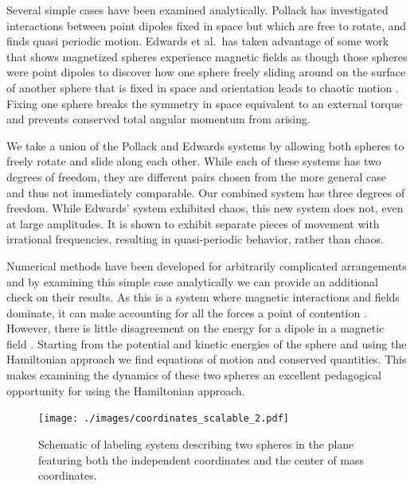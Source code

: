 \documentclass[prbg,preprint]{revtex4-1}
\begin{document}
Several simple cases have been examined analytically.
Pollack \cite{doi:10.1139/p96-151} has investigated interactions between point dipoles fixed in space but which are free to rotate, and finds quasi periodic motion.
Edwards et al.\ has taken advantage of some work that shows magnetized spheres experience magnetic fields as though those spheres were point dipoles \cite{Edwards:2017aa} to discover how one sphere freely sliding around on the surface of another sphere that is fixed in space and orientation leads to chaotic motion \cite{Edwards:2017ab}.
Fixing one sphere breaks the symmetry in space equivalent to an external torque and prevents conserved total angular momentum from arising.

We take a union of the Pollack and Edwards systems by allowing both spheres to freely rotate and slide along each other.
While each of these systems has two degrees of freedom, they are different pairs chosen from the more general case and thus not immediately comparable.
Our combined system has three degrees of freedom.
While Edwards' system exhibited chaos, this new system does not, even at large amplitudes. It is shown to exhibit separate pieces of movement with irrational frequencies, resulting in quasi-periodic behavior, rather than chaos.

Numerical methods have been developed for arbitrarily complicated arrangements \cite{Furlani:1995aa} and by examining this simple case analytically we can provide an additional check on their results.
As this is a system where magnetic interactions and fields dominate, it can make accounting for all the forces a point of contention 
\cite{Boyer:1988aa, Vaidman:1990aa, Griffiths:1992aa, Brownstein:1993aa, Hnizdo:1997aa}
.
However, there is little disagreement on the energy for a dipole in a magnetic field \cite{Greene:1971aa, Griffiths:1992aa}. 
Starting from the potential and kinetic energies of the sphere and using the Hamiltonian approach we find equations of motion and conserved quantities.
This makes examining the dynamics of these two spheres an excellent pedagogical opportunity for using the Hamiltonian approach.


\begin{figure}[h]
  \centering
  \texttt{[image: ./images/coordinates\_scalable\_2.pdf]}
  \caption{Schematic of labeling system describing two spheres in the plane featuring both the independent coordinates and the center of mass coordinates.}
\end{figure}
\end{document}
